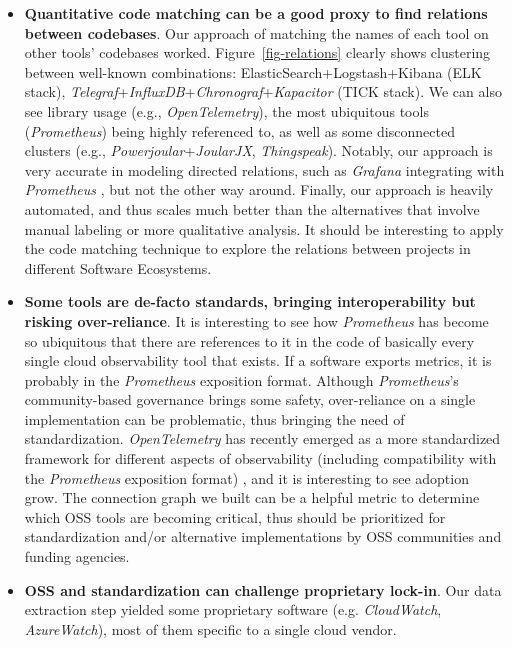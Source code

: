 \documentclass[sigconf]{acmart}
\begin{document}
\begin{itemize}
\item
  \textbf{Quantitative code matching can be a good proxy to find relations
  between codebases}. Our approach of matching the names of each tool on other
  tools' codebases worked. Figure~\ref{fig-relations} clearly shows clustering
  between well-known combinations: ElasticSearch+Logstash+Kibana (ELK stack),
  \emph{Telegraf}+\emph{InfluxDB}+\emph{Chronograf}+\emph{Kapacitor} (TICK
  stack). We can also see library usage (e.g., \emph{OpenTelemetry}), the most
  ubiquitous tools (\emph{Prometheus}) being highly referenced to, as well
  as some disconnected clusters (e.g., \emph{Powerjoular}+\emph{JoularJX},
  \emph{Thingspeak}). Notably, our approach is very accurate in modeling
  directed relations, such as \emph{Grafana} integrating with \emph{Prometheus}
  \cite{grafana-prometheus-docs}, but not the other way around. Finally,
  our approach is heavily automated, and thus scales much better than the
  alternatives that involve manual labeling or more qualitative analysis. It
  should be interesting to apply the code matching technique to explore the
  relations between projects in different Software Ecosystems.
\item
  \textbf{Some tools are de-facto standards, bringing interoperability
  but risking over-reliance}. It is interesting to see how
  \emph{Prometheus} has become so ubiquitous that there are references
  to it in the code of basically every single cloud observability tool
  that exists. If a software exports metrics, it is probably in the
  \emph{Prometheus} exposition format. Although \emph{Prometheus}'s
  community-based governance brings some safety, over-reliance on a
  single implementation can be problematic, thus bringing the need of
  standardization. \emph{OpenTelemetry} has recently emerged as a more
  standardized framework for different aspects of observability
  (including compatibility with the \emph{Prometheus} exposition format)
  \cite{prometheusotel}, and it is interesting to see adoption grow.
  The connection graph we built can be a helpful metric to determine
  which OSS tools are becoming critical, thus should be prioritized for
  standardization and/or alternative implementations by OSS communities
  and funding agencies.
\item
  \textbf{OSS and standardization can challenge proprietary lock-in}. Our data
  extraction step yielded some proprietary software (e.g. \emph{CloudWatch},
  \emph{AzureWatch}), most of them specific to a single cloud vendor.

\end{itemize}
\end{document}
